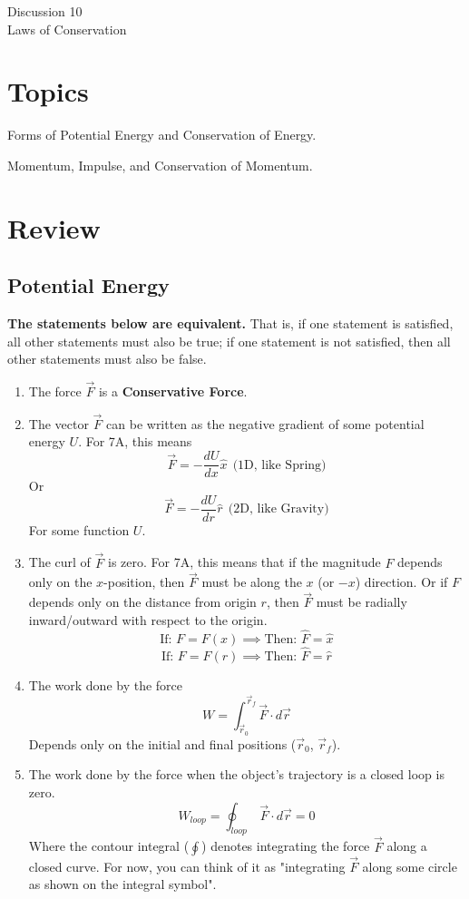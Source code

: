 \documentclass[11pt]{article}
\theoremstyle{gangnamstyle}{\newtheorem{definition}{Definition}[]}
\theoremstyle{gangnamstyle}{\newtheorem{example}{Example}[]}
\theoremstyle{gangnamstyle}{\newtheorem{problem}{Problem}[]}
\begin{document}
\normalfont
\pagestyle{pages}


\begin{center}
\vspace{3in}
{\Large Discussion 10 } \\ [0.05in]
Laws of Conservation \\ [-0.5in]
\end{center}

\section*{Topics}
Forms of Potential Energy and Conservation of Energy. 

Momentum, Impulse, and Conservation of Momentum. 

\section{Review}

\subsection{Potential Energy}

\textbf{The statements below are equivalent.} That is, if one statement is satisfied, all other statements must also be true; if one statement is not satisfied, then all other statements must also be false. 
\begin{enumerate}
\item The force $\Vec{F}$ is a \textbf{Conservative Force}. 
\item The vector $\Vec{F}$ can be written as the negative gradient of some potential energy $U$. For 7A, this means 
\[ \Vec{F} = - \frac{dU}{dx}\hat{x} \ \ \text{(1D, like Spring)} \]
Or 
\[ \Vec{F} = - \frac{dU}{dr}\hat{r} \ \ \text{(2D, like Gravity)} \]
For some function $U$. 
\item The curl of $\Vec{F}$ is zero. For 7A, this means that if the magnitude $F$ depends only on the $x$-position, then $\Vec{F}$ must be along the $x$ (or $-x$) direction. Or if $F$ depends only on the distance from origin $r$, then $\Vec{F}$ must be radially inward/outward with respect to the origin. 
\[ \text{If: } F = F(x) \implies \text{Then: } \hat{F} = \hat{x} \]
\[ \text{If: } F = F(r) \implies \text{Then: } \hat{F} = \hat{r} \]
\item The work done by the force 
\[ W = \int_{\Vec{r}_0}^{\Vec{r}_f} \Vec{F} \cdot d\Vec{r} \]
Depends only on the initial and final positions (${\Vec{r}_0}$, ${\Vec{r}_f}$). 
\item The work done by the force when the object's trajectory is a closed loop is zero. 
\[ W_{loop} = \oint_{loop} \ \Vec{F} \cdot d\Vec{r} = 0 \]
Where the contour integral ($\oint$) denotes integrating the force $\Vec{F}$ along a closed curve. For now, you can think of it as "integrating $\Vec{F}$ along some circle as shown on the integral symbol". 
\end{enumerate}
\end{document}
